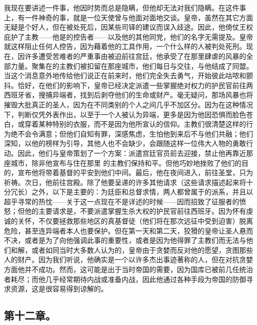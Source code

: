 我现在要讲述一件事，他因时势而总是隐瞒，但他却无法对我们隐瞒。在这件事上，有一件神奇的事，就是一位天使曾与他面对面地交谈。皇帝，虽然在其它方面无疑是个好人，但在被处死后，因某些司铎的建议而误入歧途。因此，他倚仗王权庇护了主教——他是的控告者——以及他的其他同党，他们的名字无需提及。皇帝就这样阻止任何人控告，因为藉着他的工具作用，一个什么样的人被判处死刑。现在，因许多遭受苦难者的严重事由被迫前往宫廷，他承受了在那里肆虐的风暴的全部力量。聚集在的主教们被扣留在那座城市，他们每日与交往，与他结成了同盟。当这个消息意外地传给他们说正在前来时，他们完全失去勇气，开始彼此咕哝和颤抖。恰好，在他们的影响下，皇帝已经决定派遣一些掌握绝对权力的护民官前往两西班牙省，搜捕异端者，找到后剥夺他们的生命或财产。毫无疑问，那场风暴也将摧毁大批真正的圣人，因为在不同类别的个人之间几乎不加区分。因为在这种情况下，判断仅凭外表作出，以至于一个人被认为异端，更多是因为他因恐惧而脸色苍白，或穿着某种特别的衣服，而不是因为他所宣认的信仰。主教们很清楚这样的行为绝不会令满意；但他们自知有罪，深感焦虑，生怕他到来后不与他们共融；他们深知，以他的榜样为引导，其他人也不会缺少，会跟随这样一位伟大人物的勇敢行动。因此，他们与皇帝策划了一个方案：派遣宫廷官员前去迎接，禁止他再靠近那座城市，除非他宣布与住在那里 的主教们保持和平。但他巧妙地挫败了他们的目的，宣布他将带着基督的平安到他们中间。最后，他在夜间进入，前往圣堂，只为祈祷。次日，他前往宫殿。除了他要呈递的许多其他请求（这些请求描述起来将十分冗长）之外，以下是主要的：为廷臣和总督求情，两人都曾属于的派系，并且以超乎寻常的热忱——关于这一点现在不是详述的时候——因而招致了征服者的愤怒；但他的主要请求是，不要派遣掌握生杀大权的护民官前往西班牙。因为怀有虔诚的关怀，不仅要拯救那些地区的真基督徒（他们将在那次远征中受到迫害）脱离危险，甚至连异端者本人也要保护。但在第一天和第二天，狡猾的皇帝让圣人悬而不决，或者是为了向他强调此事的重要性，或者是因为他得罪了主教们而无法与他们和解，或者如同当时大多数人认为的，皇帝由于贪婪而反对他的愿望，贪图那些人的财产。因为我们听说，他确实是一个以许多杰出事迹著称的人，但在对抗贪婪方面他并不成功。然而，这可能是出于当时帝国的需要，因为国库已被前几任统治者耗尽；而他几乎经常期待内战或准备内战，因此他通过各种手段为帝国的防御寻求资源，这是很容易得到谅解的。\par


\subsection{第十二章。}


